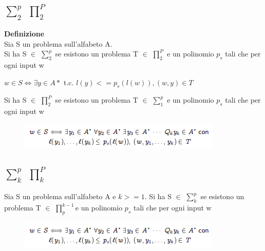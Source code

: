 \subsection{$\sum_{2}^p$ $\prod_{2}^{P}$}
\textbf{Definizione}\\
Sia S un problema sull’alfabeto A.\\
Si ha S $\in$ $\sum_{2}^p$ se esistono un problema T $\in$ $\prod_{2}^{P}$ e un polinomio $p_s$ tali che per ogni input w
\begin{center}
      $w \in S \Longleftrightarrow \exists y \in A*$ t.c. $l(y) <= p_s (l(w)), (w, y) \in T$
\end{center}
Si ha S $\in$  $\prod_{2}^{P}$ se esistono un problema T $\in$ $\sum_{1}^p$ e un polinomio $p_s$ tali che per ogni input w
\begin{center}
    \begin{figure}[htp]
        \centering
        \includegraphics[scale=0.9]{tesi_stile/img/foto7cap15.png}
    \end{figure}
\end{center}
\newpage
\subsection{$\sum_{k}^p$ $\prod_{k}^{P}$}
Sia S un problema sull’alfabeto A e $k >= 1$. Si ha S $\in$ $\sum_{k}^p$  se esistono un problema T $\in$ $\prod_{p}^{k-1}$e un polinomio $p_s$ tali che per ogni input w
\begin{center}
    \begin{figure}[htp]
        \centering
        \includegraphics[scale=0.9]{tesi_stile/img/foto7cap15.png}
    \end{figure}
\end{center}
